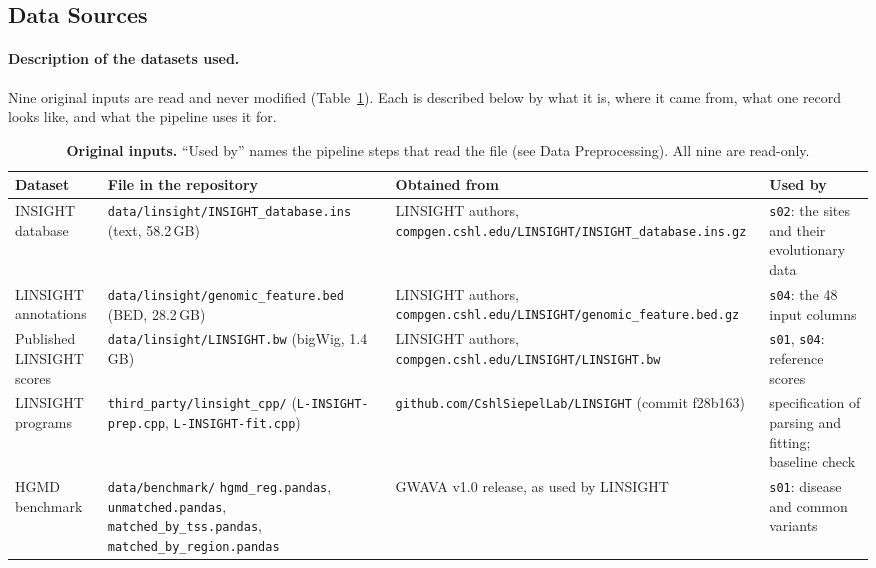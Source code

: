 \documentclass[11pt]{article}
\newcommand{\file}[1]{\nolinkurl{#1}}
\begin{document}
\subsection*{Data Sources}

\paragraph{Description of the datasets used.} Nine original inputs are read and never modified
(Table~\ref{tab:sources}). Each is described below by what it is, where it came from, what one record looks
like, and what the pipeline uses it for.

\begin{table}[t]
\centering\footnotesize
\caption{\textbf{Original inputs.} ``Used by'' names the pipeline steps that read the file
(see Data Preprocessing). All nine are read-only.}
\label{tab:sources}
\begin{tabularx}{\textwidth}{@{}>{\raggedright\arraybackslash}p{2.55cm} >{\raggedright\arraybackslash}X >{\raggedright\arraybackslash}p{3.6cm} >{\raggedright\arraybackslash}p{3.0cm}@{}}
\toprule
Dataset & File in the repository & Obtained from & Used by \\
\midrule
INSIGHT database & \file{data/linsight/INSIGHT_database.ins} (text, 58.2\,GB) & LINSIGHT authors, \file{compgen.cshl.edu/LINSIGHT/INSIGHT_database.ins.gz} & \file{s02}: the sites and their evolutionary data \\
48 LINSIGHT annotations & \file{data/linsight/genomic_feature.bed} (BED, 28.2\,GB) & LINSIGHT authors, \file{compgen.cshl.edu/LINSIGHT/genomic_feature.bed.gz} & \file{s04}: the 48 input columns \\
Published LINSIGHT scores & \file{data/linsight/LINSIGHT.bw} (bigWig, 1.4\,GB) & LINSIGHT authors, \file{compgen.cshl.edu/LINSIGHT/LINSIGHT.bw} & \file{s01}, \file{s04}: reference scores \\
LINSIGHT programs & \file{third_party/linsight_cpp/} (\file{L-INSIGHT-prep.cpp}, \file{L-INSIGHT-fit.cpp}) & \file{github.com/CshlSiepelLab/LINSIGHT} (commit f28b163) & specification of parsing and fitting; baseline check \\
HGMD benchmark & \file{data/benchmark/} \file{hgmd_reg.pandas}, \file{unmatched.pandas}, \file{matched_by_tss.pandas}, \file{matched_by_region.pandas} & GWAVA v1.0 release, as used by LINSIGHT & \file{s01}: disease and common variants \\

\end{tabularx}
\end{table}
\end{document}
